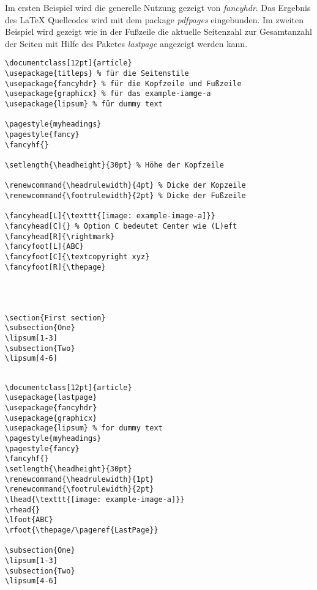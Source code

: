 Im ersten Beispiel wird die generelle Nutzung gezeigt von \emph{fancyhdr}. Das Ergebnis des LaTeX Quellcodes wird mit dem package \emph{pdfpages} eingebunden. Im zweiten Beispiel wird gezeigt wie in der Fußzeile die aktuelle Seitenzahl zur Gesamtanzahl der Seiten mit Hilfe des Paketes \emph{lastpage} angezeigt werden kann.
\newpage
\begin{lstlisting}[style=LaTeX]
\documentclass[12pt]{article}
\usepackage{titleps} % für die Seitenstile
\usepackage{fancyhdr} % für die Kopfzeile und Fußzeile
\usepackage{graphicx} % für das example-iamge-a
\usepackage{lipsum} % für dummy text

\pagestyle{myheadings}
\pagestyle{fancy}
\fancyhf{}

\setlength{\headheight}{30pt} % Höhe der Kopfzeile

\renewcommand{\headrulewidth}{4pt} % Dicke der Kopzeile
\renewcommand{\footrulewidth}{2pt} % Dicke der Fußzeile

\fancyhead[L]{\texttt{[image: example-image-a]}}
\fancyhead[C]{} % Option C bedeutet Center wie (L)eft
\fancyhead[R]{\rightmark}
\fancyfoot[L]{ABC}
\fancyfoot[C]{\textcopyright xyz}
\fancyfoot[R]{\thepage}




\section{First section}
\subsection{One}
\lipsum[1-3]
\subsection{Two}
\lipsum[4-6]


\end{lstlisting}

 

\begin{lstlisting}[style=LaTeX]
\documentclass[12pt]{article}
\usepackage{lastpage}
\usepackage{fancyhdr}
\usepackage{graphicx}
\usepackage{lipsum} % for dummy text
\pagestyle{myheadings}
\pagestyle{fancy}
\fancyhf{}
\setlength{\headheight}{30pt}
\renewcommand{\headrulewidth}{1pt}
\renewcommand{\footrulewidth}{2pt}
\lhead{\texttt{[image: example-image-a]}}
\rhead{}
\lfoot{ABC}
\rfoot{\thepage/\pageref{LastPage}}

\subsection{One}
\lipsum[1-3]
\subsection{Two}
\lipsum[4-6]

\end{lstlisting}

 
